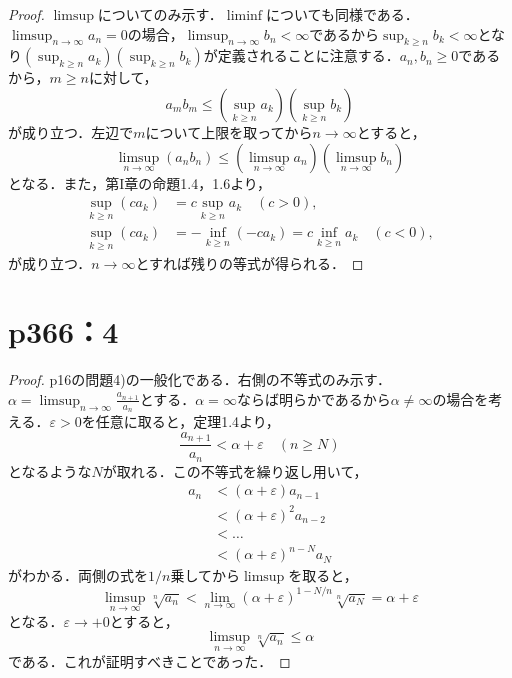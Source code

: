 \documentclass[a4paper,10pt,fleqn]{ltjsarticle}
\begin{document}
\begin{leftbar}
    \begin{proof}
        $\limsup$についてのみ示す．$\liminf$についても同様である．
        $\limsup_{n \to \infty} a_n = 0$の場合，$\limsup_{n \to \infty} b_n < \infty$であるから$\sup_{k \geq n} b_k < \infty$となり$\left(\sup _{k \geq n} a_k\right) \left(\sup _{k \geq n} b_k\right)$が定義されることに注意する．$a_n, b_n \geq 0$であるから，$m \geq n$に対して，
        \[
            a_m b_m \leq \left(\sup _{k \geq n} a_k\right) \left(\sup _{k \geq n} b_k\right)
        \]
        が成り立つ．左辺で$m$について上限を取ってから$n \to \infty$とすると，
        \[
            \limsup_{n \to \infty} (a_n b_n) \leq \left(\limsup _{n \to \infty} a_n\right) \left(\limsup_{n \to \infty} b_n\right)
        \]
        となる．また，第I章の命題1.4，1.6より，
        \begin{align*}
            \sup_{k \geq n} (c a_k) & = c\sup_{k \geq n} a_k \quad (c > 0),                             \\
            \sup_{k \geq n} (c a_k) & = -\inf_{k \geq n} (-c a_k) = c\inf_{k \geq n} a_k \quad (c < 0),
        \end{align*}
        が成り立つ．$n \to \infty$とすれば残りの等式が得られる．
    \end{proof}
\end{leftbar}

\section*{p366：4}

\begin{leftbar}
    \begin{proof}
        p16の問題4)の一般化である．右側の不等式のみ示す．
        $\alpha = \limsup _{n \to \infty} \frac{a_{n+1}}{a_{n}}$とする．$\alpha = \infty$ならば明らかであるから$\alpha \neq \infty$の場合を考える．$\varepsilon > 0$を任意に取ると，定理1.4より，
        \[
            \frac{a_{n+1}}{a_{n}} < \alpha + \varepsilon \quad (n \geq N)
        \]
        となるような$N$が取れる．この不等式を繰り返し用いて，
        \begin{align*}
            a_n
             & < (\alpha + \varepsilon) a_{n-1}   \\
             & < (\alpha + \varepsilon)^2 a_{n-2} \\
             & < \ldots                           \\
             & < (\alpha + \varepsilon)^{n-N} a_N
        \end{align*}
        がわかる．両側の式を$1/n$乗してから$\limsup$を取ると，
        \[
            \limsup _{n \to \infty} \sqrt[n]{a_n} < \lim _{n \to \infty} (\alpha + \varepsilon)^{1-N/n} \sqrt[n]{a_N} = \alpha + \varepsilon
        \]
        となる．$\varepsilon \to +0$とすると，
        \[
            \limsup _{n \to \infty} \sqrt[n]{a_n} \leq \alpha
        \]
        である．これが証明すべきことであった．
    \end{proof}
\end{leftbar}
\end{document}
